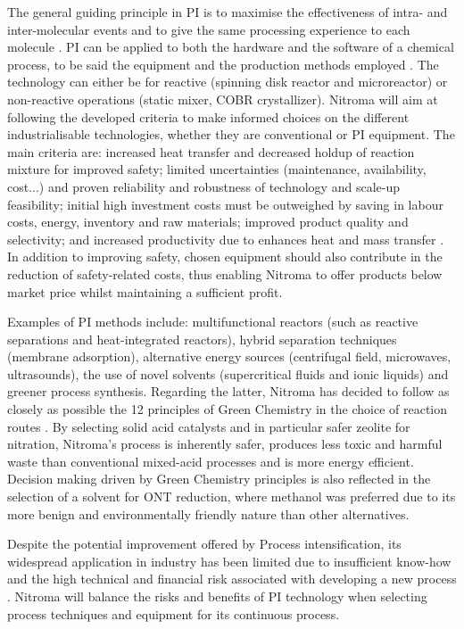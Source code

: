 The general guiding principle in PI is to maximise the effectiveness of intra- and inter-molecular events and to give the same processing experience to each molecule \cite{randall_process_2020}. PI can be applied to both the hardware and the software of a chemical process, to be said the equipment and the production methods employed \cite{stankiewicz_re-engineering_2003}. The technology can either be for reactive (spinning disk reactor and microreactor) or non-reactive operations (static mixer, COBR crystallizer). Nitroma will aim at following the developed criteria to make informed choices on the different industrialisable technologies, whether they are conventional or PI equipment. The main criteria are: increased heat transfer and decreased holdup of reaction mixture for improved safety; limited uncertainties (maintenance, availability, cost...) and proven reliability and robustness of technology and scale-up feasibility; initial high investment costs must be outweighed by saving in labour costs, energy, inventory and raw materials; improved product quality and selectivity; and increased productivity due to enhances heat and mass transfer \cite{randall_process_2020}. In addition to improving safety, chosen equipment should also contribute in the reduction of safety-related costs, thus enabling Nitroma to offer products below market price whilst maintaining a sufficient profit.

Examples of PI methods include: multifunctional reactors (such as reactive separations and heat-integrated reactors), hybrid separation techniques (membrane adsorption), alternative energy sources (centrifugal field, microwaves, ultrasounds), the use of novel solvents (supercritical fluids and ionic liquids) and greener process synthesis. Regarding the latter, Nitroma has decided to follow as closely as possible the 12 principles of Green Chemistry in the choice of reaction routes \cite{anastas_green_2010}. By selecting solid acid catalysts and in particular safer zeolite for nitration, Nitroma's process is inherently safer, produces less toxic and harmful waste than conventional mixed-acid processes and is more energy efficient. Decision making driven by Green Chemistry principles is also reflected in the selection of a solvent for ONT reduction, where methanol was preferred due to its more benign and environmentally friendly nature than other alternatives.

Despite the potential improvement offered by Process intensification, its widespread application in industry has been limited due to insufficient know-how and the high technical and financial risk associated with developing a new process \cite{randall_process_2020}. Nitroma will balance the risks and benefits of PI technology when selecting process techniques and equipment for its continuous process.

